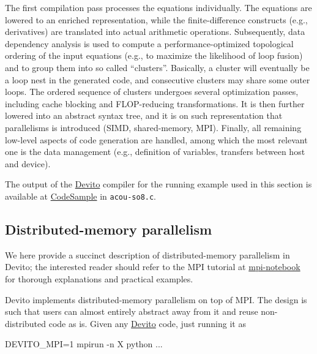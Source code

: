 \documentclass[conference]{IEEEtran}
\newenvironment{Shaded}{}{}
\newcommand{\DecValTok}[1]{\textcolor[rgb]{0.25,0.63,0.44}{{#1}}}
\newcommand{\NormalTok}[1]{{#1}}
\begin{document}
The first compilation pass processes the equations individually. The
equations are lowered to an enriched representation, while the
finite-difference constructs (e.g., derivatives) are translated into
actual arithmetic operations. Subsequently, data dependency analysis is
used to compute a performance-optimized topological ordering of the
input equations (e.g., to maximize the likelihood of loop fusion) and to
group them into so called ``clusters''. Basically, a cluster will
eventually be a loop nest in the generated code, and consecutive
clusters may share some outer loops. The ordered sequence of clusters
undergoes several optimization passes, including cache blocking and
FLOP-reducing transformations. It is then further lowered into an
abstract syntax tree, and it is on such representation that parallelisms
is introduced (SIMD, shared-memory, MPI). Finally, all remaining
low-level aspects of code generation are handled, among which the most
relevant one is the data management (e.g., definition of variables,
transfers between host and device).

The output of the \href{https://github.com/devitocodes/devito}{Devito} compiler for the running example used in this
section is available at
\href{https://github.com/mloubout/SC20Paper/tree/master/codesamples}{CodeSample}
in \texttt{acou-so8.c}.

\subsection{Distributed-memory
parallelism}\label{distributed-memory-parallelism}

We here provide a succinct description of distributed-memory parallelism
in Devito; the interested reader should refer to the MPI tutorial at
\href{https://github.com/devitocodes/devito/blob/v4.2/examples/mpi/overview.ipynb}{mpi-notebook}
for thorough explanations and practical examples.

Devito implements distributed-memory parallelism on top of MPI. The design
is such that users can almost entirely abstract away from it and reuse
non-distributed code as is. Given any \href{https://github.com/devitocodes/devito}{Devito} code, just running it as

\begin{Shaded}
\begin{Highlighting}[]
\NormalTok{DEVITO_MPI=}\DecValTok{1} \NormalTok{mpirun -n X python ...}
\end{Highlighting}
\end{Shaded}
\end{document}
